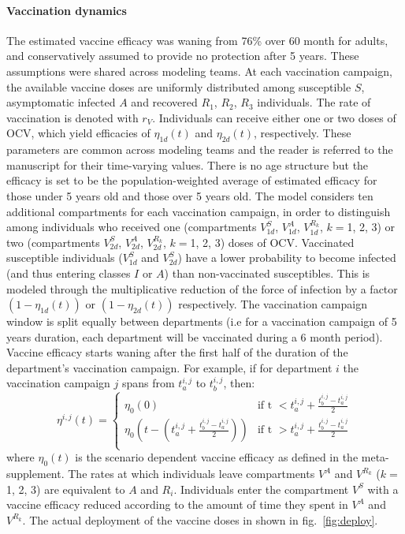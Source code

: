 \paragraph{Vaccination dynamics} The estimated vaccine efficacy was waning from 76\% over 60 month for adults, and conservatively assumed to provide no protection after 5 years. These assumptions were shared across modeling teams. 
At each vaccination campaign, the available vaccine doses are uniformly distributed among susceptible $S$, asymptomatic infected $A$ and recovered $R_{1}$, $R_2$, $R_3$ individuals. The rate of vaccination is denoted with $r_V$. Individuals can receive either one or two doses of OCV, which yield efficacies of $\eta_{1d}(t)$ and $\eta_{2d}(t)$, respectively. These parameters are common across modeling teams and the reader is referred to the manuscript for their time-varying values. There is no age structure but the efficacy is set to be the population-weighted average of estimated efficacy for those under 5 years old and those over 5 years old.
 The model considers ten additional compartments for each vaccination campaign, in order to distinguish among individuals who received one (compartments $V^S_{1d}$, $V^A_{1d}$, $V^{R_k}_{1d}$, $k=$1, 2, 3) or two (compartments $V^S_{2d}$, $V^A_{2d}$, $V^{R_k}_{2d}$, $k=$1, 2, 3) doses of OCV. Vaccinated susceptible individuals ($V^S_{1d}$ and $V^S_{2d}$) have a lower probability to become infected (and thus entering classes $I$ or $A$) than non-vaccinated susceptibles. This is modeled through the multiplicative reduction of the force of infection by a  factor $(1-\eta_{1d}(t))$ or $(1-\eta_{2d}(t))$ respectively.
The vaccination campaign window is split equally between departments (i.e for a vaccination campaign of 5 years duration, each department will be vaccinated during a 6 month period). Vaccine efficacy starts waning after the first half of the duration of the department's vaccination campaign. For example, if for department $i$ the vaccination campaign $j$ spans from $t^{i,j}_a$ to $t^{i,j}_b$, then:
    \begin{equation}
\eta^{i,j}(t) = \left\{
    \begin{array}{ll}
        \eta_0(0) & \mbox{if t $<  t^{i,j}_a + \frac{t^{i,j}_b - t^{i,j}_a}{2}$} \\
        \eta_0(t -  (t^{i,j}_a +  \frac{t^{i,j}_b - t^{i,j}_a}{2}) ) & \mbox{if t $>  t^{i,j}_a + \frac{t^{i,j}_b - t^{i,j}_a}{2}$} \\
    \end{array}
\right.
\end{equation}
where $\eta_0(t)$ is the scenario dependent vaccine efficacy as defined in the meta-supplement.
The rates at which individuals leave compartments $V^A$ and $V^{R_k}$ ($k=$1, 2, 3) are equivalent to $A$ and $R_i$. Individuals enter the compartment $V^S$ with a vaccine efficacy reduced according to the amount of time they spent in $V^A$ and $V^{R_k}$. The actual deployment of the vaccine doses in shown in fig.~\ref{fig:deploy}.

